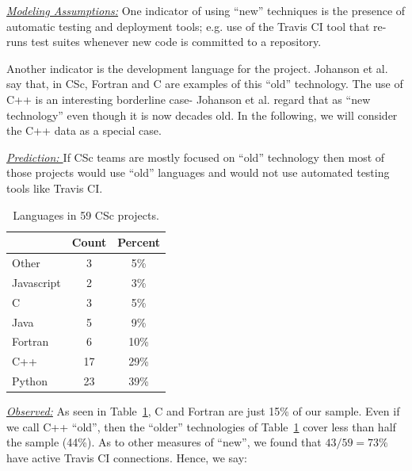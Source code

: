 \documentclass[conference,10pt]{IEEEtran}
\begin{document}
\noindent \textit{\underline{Modeling Assumptions:}} 
One indicator of using ``new'' techniques is the presence of automatic testing and deployment tools; e.g. use of the Travis CI tool that re-runs test suites whenever new code is committed to a repository. 

Another indicator is the development language for the project. 
Johanson et al.~\cite{johan18_secs} say that, in CSc, Fortran and C are examples of this ``old'' technology. The use of C++ is an interesting borderline case- Johanson et al. regard that as ``new technology'' even though it is now decades old. In the following, we will consider the C++ data as a special case.




\noindent \textit{\underline{Prediction: }} If CSc teams are mostly focused on ``old'' technology then most of those projects would use ``old'' languages and would not use automated testing
tools like  Travis CI.


\begin{table}
\vspace{-10pt}
\caption{Languages in 59 CSc projects.  
}\label{tbl:language}
\vspace{-12pt}
 \footnotesize
 \hspace{-3pt}\begin{tabular}{l|c|c}
 \multicolumn{1}{c|}{} & \multicolumn{1}{c|}{Count} & \multicolumn{1}{c}{Percent}\\
\hline
Other & 3 &  5\%  \\ 
Javascript	& 2 & 3\% \\ 
C &	3 & 5\% \\ 
Java	& 5 & 9\% \\ 
Fortran	& 6 & 10\% \\
C++	& 17 & 29\% \\
Python & 23 & 39\% 
\end{tabular}
\vspace{-10pt}
\end{table} \noindent\textit{\underline{Observed:}} 
As seen in Table~\ref{tbl:language}, C and Fortran are just 15\% of our sample.
Even if we call C++ ``old'', then the ``older'' technologies of Table~\ref{tbl:language}
cover less than half the sample (44\%).
As to other measures of ``new'', we found that  $43/59=73\%$
have active
Travis CI connections.  Hence, we say:
\end{document}
